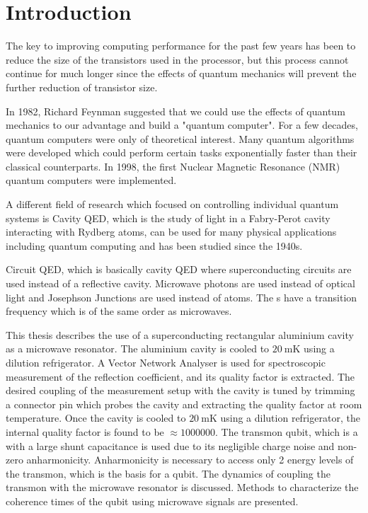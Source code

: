 
\chapter{Introduction} %

\label{Chapter1} %

The key to improving computing performance for the past few years has been to reduce the size of the transistors used in the processor, but this process cannot continue for much longer since the effects of quantum mechanics will prevent the further reduction of transistor size.

In 1982, Richard Feynman suggested that we could use the effects of quantum mechanics to our advantage and build a "quantum computer". For a few decades, quantum computers were only of theoretical interest. Many quantum algorithms were developed which could perform  certain tasks exponentially faster than their classical counterparts. In 1998, the first Nuclear Magnetic Resonance (NMR) quantum computers were implemented.

A different field of research which focused on controlling individual quantum systems is Cavity QED, which is the study of light in a Fabry-Perot cavity interacting with Rydberg atoms, can be used for many physical applications including quantum computing and has been studied since the 1940s.

Circuit QED, which is basically cavity QED where superconducting circuits are used instead of a reflective cavity. Microwave photons are used instead of optical light and Josephson Junctions are used instead of atoms. The {\JJ}s have a transition frequency which is of the same order as microwaves.

This thesis describes the use of a superconducting rectangular aluminium cavity as a microwave resonator. The aluminium cavity is cooled to $\SI{20}{\milli\kelvin}$ using a dilution refrigerator. A Vector Network Analyser is used for spectroscopic measurement of the reflection coefficient, and its quality factor is extracted. The desired coupling of the measurement setup with the cavity is tuned by trimming a connector pin which probes the cavity and extracting the quality factor at room temperature. Once the cavity is cooled to $\SI{20}{\milli\kelvin}$ using a dilution refrigerator, the internal quality factor is found to be $\approx 1000000$. The transmon qubit, which is a \JJ with a large shunt capacitance is used due to its negligible charge noise and non-zero anharmonicity. Anharmonicity is necessary to access only 2 energy levels of the transmon, which is the basis for a qubit. The dynamics of coupling the transmon with the microwave resonator is discussed. Methods to characterize the coherence times of the qubit using microwave signals are presented.